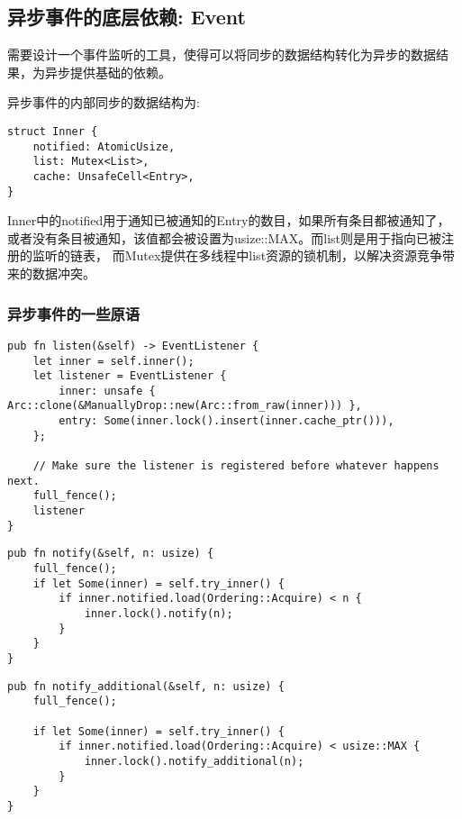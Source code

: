 \subsection{异步事件的底层依赖: Event}

需要设计一个事件监听的工具，使得可以将同步的数据结构转化为异步的数据结果，为异步提供基础的依赖。

异步事件的内部同步的数据结构为:

\begin{lstlisting}[caption=异步事件底层的同步结构]
struct Inner {
    notified: AtomicUsize,
    list: Mutex<List>,
    cache: UnsafeCell<Entry>,
}
\end{lstlisting}

Inner中的notified用于通知已被通知的Entry的数目，如果所有条目都被通知了，或者没有条目被通知，该值都会被设置为usize::MAX。而list则是用于指向已被注册的监听的链表， 而Mutex提供在多线程中list资源的锁机制，以解决资源竞争带来的数据冲突。

\subsubsection{异步事件的一些原语}
\label{sssec:event}

\begin{lstlisting}[caption = 监听者的注册]
pub fn listen(&self) -> EventListener {
    let inner = self.inner();
    let listener = EventListener {
        inner: unsafe { Arc::clone(&ManuallyDrop::new(Arc::from_raw(inner))) },
        entry: Some(inner.lock().insert(inner.cache_ptr())),
    };

    // Make sure the listener is registered before whatever happens next.
    full_fence();
    listener
}
\end{lstlisting}

\begin{lstlisting}[caption = 通知一定数量的监听者]
pub fn notify(&self, n: usize) {
    full_fence();
    if let Some(inner) = self.try_inner() {
        if inner.notified.load(Ordering::Acquire) < n {
            inner.lock().notify(n);
        }
    }
}
\end{lstlisting}

\begin{lstlisting}[caption = 通知一定数量没有被通知的监听者]
pub fn notify_additional(&self, n: usize) {
    full_fence();

    if let Some(inner) = self.try_inner() {
        if inner.notified.load(Ordering::Acquire) < usize::MAX {
            inner.lock().notify_additional(n);
        }
    }
}
\end{lstlisting}

